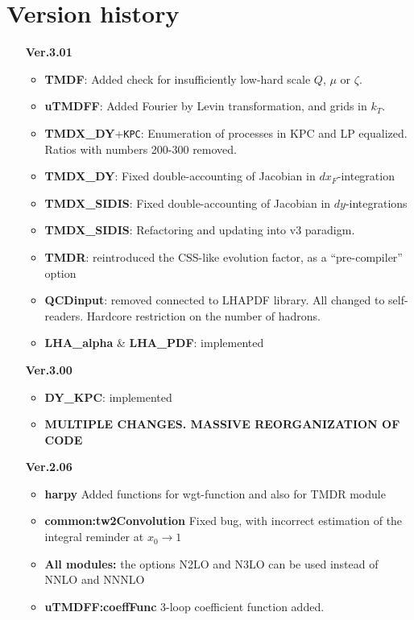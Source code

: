 \documentclass[prd,nofootinbib,eqsecnum,final]{revtex4}
\renewcommand{\(}{\left(}
\renewcommand{\)}{\right)}
\renewcommand{\[}{\left[}
\renewcommand{\]}{\right]}
\newcommand{\blue}[1]{{\color{blue} #1}}
\begin{document}
\section{Version history}
\begin{itemize}
\item[\textbf{Ver.3.01}]
\begin{itemize}
	\item \textbf{TMDF}: Added check for insufficiently low-hard scale $Q$, $\mu$ or $\zeta$.
	\item \textbf{uTMDFF}: Added Fourier by Levin transformation, and grids in $k_T$.
	\item \textbf{TMDX\_DY}+\texttt{KPC}: Enumeration of processes in KPC and LP equalized. Ratios with numbers 200-300 removed.
	\item \textbf{TMDX\_DY}: Fixed double-accounting of Jacobian in $dx_F$-integration 
	\item \textbf{TMDX\_SIDIS}: Fixed double-accounting of Jacobian in $dy$-integrations
	\item \textbf{TMDX\_SIDIS}: Refactoring and updating into v3 paradigm.
	\item \textbf{TMDR}: reintroduced the CSS-like evolution factor, as a ``pre-compiler'' option 
	\item \textbf{QCDinput}: removed connected to LHAPDF library. All changed to self-readers. Hardcore restriction on the number of hadrons.
	\item \textbf{LHA\_alpha} \& \textbf{LHA\_PDF}: implemented
\end{itemize}
\item[\textbf{Ver.3.00}]
\begin{itemize}
	\item \textbf{DY\_KPC}: implemented
	\item \blue{\textbf{MULTIPLE CHANGES. MASSIVE REORGANIZATION OF CODE}}
\end{itemize}
\item[\textbf{Ver.2.06}]
\begin{itemize}
	\item \textbf{harpy} Added functions for wgt-function and also for TMDR module
	\item \textbf{common:tw2Convolution} Fixed bug, with incorrect estimation of the integral reminder at $x_0\to 1$
	\item \textbf{All modules:} the options N2LO and N3LO can be used instead of NNLO and NNNLO
	\item \textbf{uTMDFF:coeffFunc} 3-loop coefficient function added. 

\end{itemize}
\end{itemize}
\end{document}
